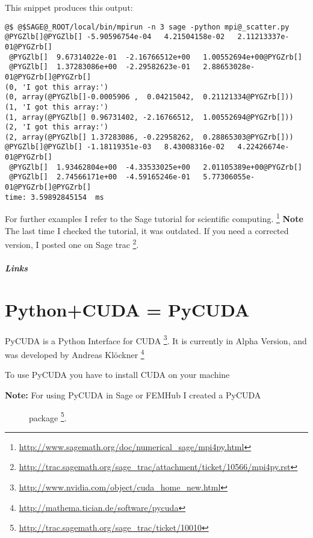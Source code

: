 \documentclass[letterpaper,10pt,english]{manual}
\begin{document}
This snippet produces this output:

\begin{Verbatim}[commandchars=@\[\]]
@$ @$SAGE@_ROOT/local/bin/mpirun -n 3 sage -python mpi@_scatter.py
@PYGZlb[]@PYGZlb[] -5.90596754e-04   4.21504158e-02   2.11213337e-01@PYGZrb[]
 @PYGZlb[]  9.67314022e-01  -2.16766512e+00   1.00552694e+00@PYGZrb[]
 @PYGZlb[]  1.37283086e+00  -2.29582623e-01   2.88653028e-01@PYGZrb[]@PYGZrb[]
(0, 'I got this array:')
(0, array(@PYGZlb[]-0.0005906 ,  0.04215042,  0.21121334@PYGZrb[]))
(1, 'I got this array:')
(1, array(@PYGZlb[] 0.96731402, -2.16766512,  1.00552694@PYGZrb[]))
(2, 'I got this array:')
(2, array(@PYGZlb[] 1.37283086, -0.22958262,  0.28865303@PYGZrb[]))
@PYGZlb[]@PYGZlb[] -1.18119351e-03   8.43008316e-02   4.22426674e-01@PYGZrb[]
 @PYGZlb[]  1.93462804e+00  -4.33533025e+00   2.01105389e+00@PYGZrb[]
 @PYGZlb[]  2.74566171e+00  -4.59165246e-01   5.77306055e-01@PYGZrb[]@PYGZrb[]
time: 3.59892845154  ms
\end{Verbatim}

For further examples I refer to the Sage tutorial for scientific
computing.  \footnote{
\href{http://www.sagemath.org/doc/numerical\_sage/mpi4py.html}{http://www.sagemath.org/doc/numerical\_sage/mpi4py.html}
}
\textbf{Note} The last time I checked the tutorial, it was outdated.
If you need a corrected version, I posted one on Sage trac \footnote{
\href{http://trac.sagemath.org/sage\_trac/attachment/ticket/10566/mpi4py.rst}{http://trac.sagemath.org/sage\_trac/attachment/ticket/10566/mpi4py.rst}
}.
\paragraph{Links}

\resetcurrentobjects
\hypertarget{--doc-PyCUDA}{}

\chapter{Python+CUDA = PyCUDA}

PyCUDA is a Python Interface for CUDA \footnote{
\href{http://www.nvidia.com/object/cuda\_home\_new.html}{http://www.nvidia.com/object/cuda\_home\_new.html}
}. It is currently in Alpha
Version, and was developed by Andreas Klöckner \footnote{
\href{http://mathema.tician.de/software/pycuda}{http://mathema.tician.de/software/pycuda}
}

To use PyCUDA you have to install CUDA on your machine
\begin{description}
\item[\textbf{Note:} For using PyCUDA in Sage or FEMHub I created a PyCUDA] \leavevmode
package \footnote{
\href{http://trac.sagemath.org/sage\_trac/ticket/10010}{http://trac.sagemath.org/sage\_trac/ticket/10010}
}.

\end{description}
\end{document}
